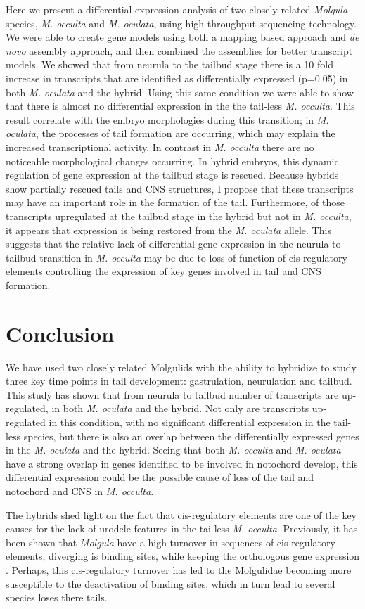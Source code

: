 Here we present a differential expression analysis of two closely related \textit{Molgula} species, \textit{M. occulta} and \textit{M. oculata}, using high throughput sequencing technology. We were able to create gene models using both a mapping based approach and \textit{de novo} assembly approach, and then combined the assemblies for better transcript models. We showed that from neurula to the tailbud stage there is a 10 fold increase in transcripts that are identified as differentially expressed (p=0.05) in both \textit{M. oculata} and the hybrid. Using this same condition we were able to show that there is almost no differential expression in the the tail-less \textit{M. occulta}. This result  correlate with the embryo morphologies during this transition; in \textit{M. oculata}, the processes of tail formation are occurring, which may explain the increased transcriptional activity. In contrast in \textit{M. occulta} there are no noticeable morphological changes occurring. In hybrid embryos, this dynamic regulation of gene expression at the tailbud stage is rescued. Because hybrids show partially rescued tails and CNS structures, I propose that these transcripts may have an important role in the formation of the tail. Furthermore, of those transcripts upregulated at the tailbud stage in the hybrid but not in \textit{M. occulta}, it appears that expression is being restored from the {\em M. oculata} allele. This suggests that the relative lack of differential gene expression in the neurula-to-tailbud transition in \textit{M. occulta} may be due to loss-of-function of cis-regulatory elements controlling the expression of key genes involved in tail and CNS formation. 

\section{Conclusion}

We have used two closely related Molgulids with the ability to hybridize to study three key time points in tail development: gastrulation, neurulation and tailbud. This study has shown that from neurula to tailbud number of transcripts are up-regulated, in both \textit{M. oculata} and the hybrid. Not only are transcripts up-regulated in this condition, with no significant differential expression in the tail-less species, but there is also an overlap between the differentially expressed genes in the \textit{M. oculata} and the hybrid. Seeing that both \textit{M. occulta} and \textit{M. oculata} have a strong overlap in genes identified to be involved in notochord develop, this differential expression could be the possible cause of loss of the tail and notochord and CNS in \textit{M. occulta}. 

The hybrids shed light on the fact that cis-regulatory elements are one of the key causes for the lack of urodele features in the tai-less \textit{M. occulta}. Previously, it has been shown that \textit{Molgula} have a high turnover in sequences of cis-regulatory elements, diverging is binding sites, while keeping the orthologous gene expression \cite{stolfi_divergent_2014}. Perhaps, this cis-regulatory turnover has led to the Molgulidae becoming more susceptible to the deactivation of binding sites, which in turn lead to several species loses there tails. 